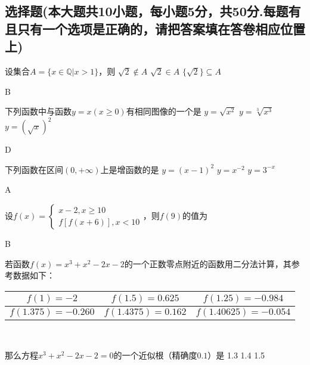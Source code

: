 \begin{exercise}
\section{选择题(本大题共10小题，每小题5分，共50分.每题有且只有一个选项是正确的，请把答案填在答卷相应位置上)}
  \item
    设集合$A=\{x\in\mathbb{Q}|x>1\}$，则\xz
      {$\sqrt2\notin A$}
      {$\sqrt2\in A$}
      {$\{\sqrt2\}\subseteq A$}
    \begin{answer}
      B
    \end{answer}
  \item
    下列函数中与函数$y=x(x\geq 0)$有相同图像的一个是\xz
      {$y=\sqrt{x^2}$}
      {$y=\sqrt[3]{x^3}$}
      {$y=(\displaystyle \sqrt x)^2 $}
    \begin{answer}
      D
    \end{answer}
  \item
    下列函数在区间$(0,+\infty) $上是增函数的是\xz
      {$y=(x-1)^2$}
      {$y=x^{-2}$}
      {$y=3^{-x}$}
    \begin{answer}
      A
    \end{answer}
  \item
    设$f(x)=\begin{cases}
      x-2,x\geq10\\f[f(x+6)],x<10
    \end{cases}$，则$f(9)$的值为\xz
    \begin{answer}
      B
    \end{answer}
  \item
    若函数$f(x)=x^3+x^2-2x-2$的一个正数零点附近的函数用二分法计算，其参考数据如下：\\
    \begin{center}
      \begin{tabular}{|c|c|c|}
        \hline
        $f(1)=-2$&$f(1.5)=0.625$&$f(1.25)=-0.984$\\
        \hline
        $f(1.375)=-0.260$&$f(1.4375)=0.162$&$f(1.40625)=-0.054$\\
        \hline
      \end{tabular}\\
    \end{center}
    那么方程$x^3+x^2-2x-2=0$的一个近似根（精确度$0.1$）是\xz
      {1.3}
      {1.4}
      {1.5}
    \begin{answer}

\end{answer}
\end{exercise}
